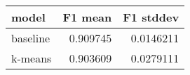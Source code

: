 \begin{tabular}{lrr}
\toprule
 model    &   F1 mean &   F1 stddev \\
\midrule
 baseline &  0.909745 &   0.0146211 \\
 k-means  &  0.903609 &   0.0279111 \\
\bottomrule
\end{tabular}